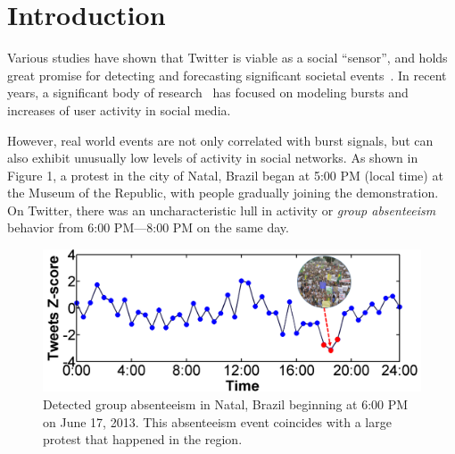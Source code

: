 \section{Introduction} \label{sec:intro}
Various studies have shown that Twitter is viable as a social ``sensor'', and holds great promise for detecting and forecasting significant societal events~\cite{bugel2013multilingual,sakaki2010earthquake}.
In recent years, a significant body of research~\cite{aggarwal2012event,hong2012discovering,lappas2009burstiness,lappas2012spatiotemporal,sakaki2010earthquake,sayyadi2009event,watanabe2011jasmine,weng2011event,yin2011geographical} has focused on modeling bursts and increases of user activity in social media.

However, real world events are not only correlated with burst signals, but can also exhibit unusually low levels of activity in social networks.
As shown in Figure 1, a protest in the city of Natal, Brazil began at 5:00 PM (local time) at the Museum of the Republic, with people gradually joining the demonstration. %
On Twitter, there was an uncharacteristic lull in activity or {\it group absenteeism} behavior from 6:00 PM---8:00 PM on the same day.



\begin{figure}[t]
\centering
\includegraphics[width=4.5in]{figures/Natal_example1.png}
\caption{Detected group absenteeism in Natal, Brazil beginning at 6:00 PM on June 17, 2013. This absenteeism event coincides with a large protest that happened in the region.}
\label{fig:natal-protest}
\end{figure}


